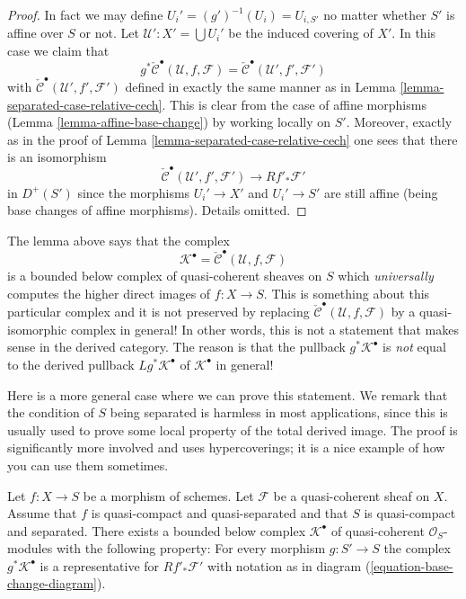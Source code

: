 \begin{proof}
In fact we may define $U_i' = (g')^{-1}(U_i) = U_{i, S'}$ no matter
whether $S'$ is affine over $S$ or not.
Let $\mathcal{U}' : X' = \bigcup U_i'$ be the induced covering of $X'$.
In this case we claim that
$$
g^*\check{\mathcal{C}}^\bullet(\mathcal{U}, f, \mathcal{F})
=
\check{\mathcal{C}}^\bullet(\mathcal{U}', f', \mathcal{F}')
$$
with $\check{\mathcal{C}}^\bullet(\mathcal{U}', f', \mathcal{F}')$
defined in exactly the same manner as in
Lemma \ref{lemma-separated-case-relative-cech}.
This is clear from the case of affine morphisms
(Lemma \ref{lemma-affine-base-change}) by working locally on $S'$.
Moreover, exactly as in the proof of
Lemma \ref{lemma-separated-case-relative-cech}
one sees that there is an isomorphism
$$
\check{\mathcal{C}}^\bullet(\mathcal{U}', f', \mathcal{F}')
\longrightarrow
Rf'_*\mathcal{F}'
$$
in $D^{+}(S')$ since the morphisms $U_i' \to X'$ and $U_i' \to S'$
are still affine (being base changes of affine morphisms).
Details omitted.
\end{proof}

\noindent
The lemma above says that the complex
$$
\mathcal{K}^\bullet = \check{\mathcal{C}}^\bullet(\mathcal{U}, f, \mathcal{F})
$$
is a bounded below complex of quasi-coherent sheaves on $S$ which
{\it universally} computes the higher direct images of $f : X \to S$.
This is something about this particular complex and
it is not preserved by replacing
$\check{\mathcal{C}}^\bullet(\mathcal{U}, f, \mathcal{F})$ by
a quasi-isomorphic complex in general! In other words, this is
not a statement that makes sense in the derived category.
The reason is that the pullback $g^*\mathcal{K}^\bullet$ is
{\it not} equal to the derived pullback $Lg^*\mathcal{K}^\bullet$
of $\mathcal{K}^\bullet$ in general!

\medskip\noindent
Here is a more general case where we can prove this statement.
We remark that the condition of $S$ being separated is harmless
in most applications, since this is usually used to prove some
local property of the total derived image.
The proof is significantly more involved and uses hypercoverings;
it is a nice example of how you can use them sometimes.

\begin{lemma}
\label{lemma-hypercoverings}
Let $f : X \to S$ be a morphism of schemes.
Let $\mathcal{F}$ be a quasi-coherent sheaf on $X$.
Assume that $f$ is quasi-compact and quasi-separated and
that $S$ is quasi-compact and separated.
There exists a bounded below complex $\mathcal{K}^\bullet$
of quasi-coherent $\mathcal{O}_S$-modules with the
following property: For every morphism
$g : S' \to S$ the complex $g^*\mathcal{K}^\bullet$ is
a representative for $Rf'_*\mathcal{F}'$ with notation as in
diagram (\ref{equation-base-change-diagram}).
\end{lemma}

